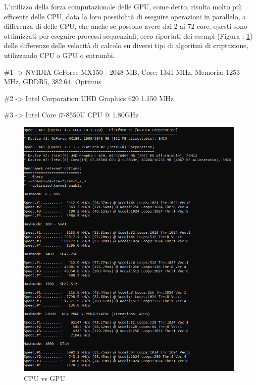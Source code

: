 \newpage

L'utilizzo della forza computazionale delle GPU, come detto, risulta molto più efficente delle CPU, data la loro possibilità di eseguire operazioni in parallelo, a differenza di delle CPU, che anche se possono avere dai 2 ai 72 core, questi sono ottimizzati per eseguire processi sequenziali, ecco riportati dei esempi (Figura : \ref{fig:CPU vs GPU}) delle differenze delle velocità di calcolo su diversi tipi di algoritmi di criptazione, utilizzando CPU o GPU o entrambi.
\newline

\#1 -> NVIDIA GeForce MX150 - 2048 MB, Core: 1341 MHz, Memoria: 1253 MHz, GDDR5, 382.64, Optimus

\#2 -> Intel Corporation UHD Graphics 620 1.150 MHz

\#3 -> Intel Core i7-8550U CPU @ 1.80GHz

\begin{figure}[ht]
    \centering
    \includegraphics[width=\linewidth]{Immagini/7/cpu_gpu.PNG}
    \caption{CPU vs GPU}
    \label{fig:CPU vs GPU}
\end{figure}

\label{chap:conc}